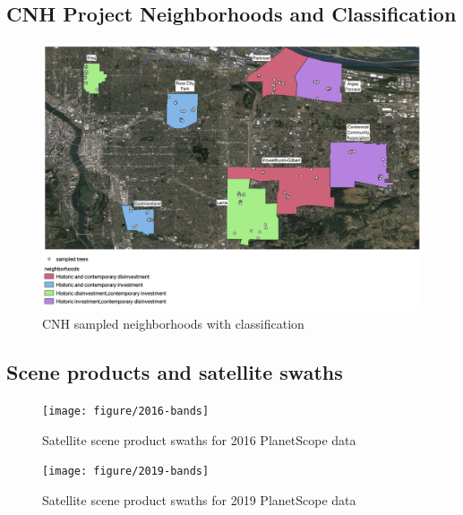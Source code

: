 \documentclass[12pt,twoside]{reedthesis}
\begin{document}
\hypertarget{cnh-project-neighborhoods-and-classification}{%
\subsection*{CNH Project Neighborhoods and Classification}\label{cnh-project-neighborhoods-and-classification}}
\begin{figure}[H]

{\centering \includegraphics[width=1\linewidth,]{figure/neighborhoods_and_trees2} 

}

\caption{CNH sampled neighborhoods with classification}\label{fig:neighborhoods}
\end{figure}
\hypertarget{scene-products-and-satellite-swaths}{%
\subsection*{Scene products and satellite swaths}\label{scene-products-and-satellite-swaths}}
\begin{figure}[H]

{\centering \texttt{[image: figure/2016-bands]} 

}

\caption{Satellite scene product swaths for 2016 PlanetScope data}\label{fig:2016-swath}
\end{figure}
\begin{figure}[H]

{\centering \texttt{[image: figure/2019-bands]} 

}

\caption{Satellite scene product swaths for 2019 PlanetScope data}\label{fig:2019-swath}
\end{figure}
\end{document}
